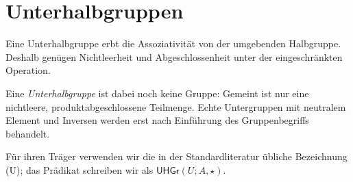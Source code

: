 \documentclass[main.tex]{subfiles}
\begin{document}
\begin{tabproofsplitwide}
  \closeproofpartwide
\end{tabproofsplitwide}

\section{Unterhalbgruppen}

Eine Unterhalbgruppe erbt die Assoziativit\"at von der umgebenden
Halbgruppe. Deshalb gen\"ugen Nichtleerheit und Abgeschlossenheit unter der
eingeschr\"ankten Operation.

Eine \emph{Unterhalbgruppe} ist dabei noch keine Gruppe: Gemeint ist nur
eine nichtleere, produktabgeschlossene Teilmenge. Echte Untergruppen mit
neutralem Element und Inversen werden erst nach Einführung des
Gruppenbegriffs behandelt.

Für ihren Träger verwenden wir die in der Standardliteratur übliche
Bezeichnung (U); das Prädikat schreiben wir als
\(\mathsf{UHGr}(U;A,\star)\).


\begin{tabproofwide}
\end{tabproofwide}
\end{document}
